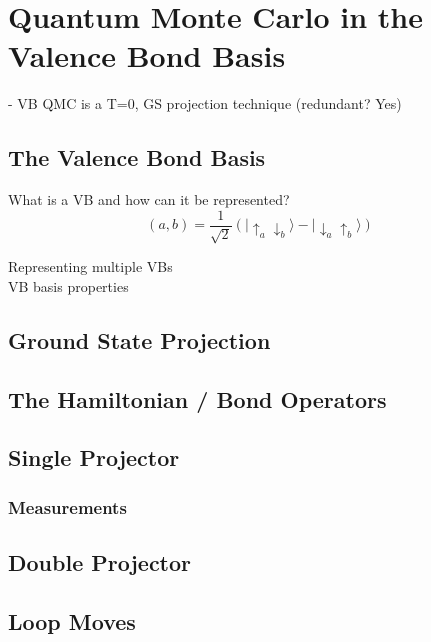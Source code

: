 \chapter{Quantum Monte Carlo in the Valence Bond Basis}

- VB QMC is a T=0, GS projection technique (redundant? Yes)\\
\section{The Valence Bond Basis}

What is a VB and how can it be represented?\\

\begin{equation}
   (a,b) = \frac{1}{\sqrt{2}}\left( \lvert \uparrow_a \downarrow_b \rangle - \lvert \downarrow_a \uparrow_b \rangle \right)
\end{equation}


Representing multiple VBs\\
VB basis properties\\
\section{Ground State Projection}
\section{The Hamiltonian / Bond Operators}
\section{Single Projector}
\subsection{Measurements}
\section{Double Projector}
\section{Loop Moves}
